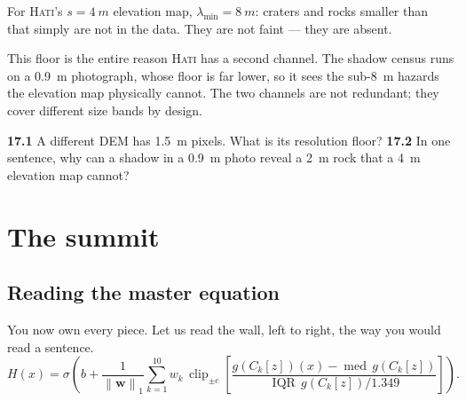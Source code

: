 \documentclass[11pt,oneside]{book}
\newcommand{\norm}[1]{\left\lVert #1\right\rVert}
\begin{document}
For \textsc{Hati}'s $s=\SI{4}{m}$ elevation map, $\lambda_{\min}=\SI{8}{m}$: craters and
rocks smaller than that simply are not in the data. They are not faint --- they are
absent.

\begin{hatibox}
This floor is the entire reason \textsc{Hati} has a second channel. The shadow census
runs on a \SI{0.9}{m} photograph, whose floor is far lower, so it sees the
sub-\SI{8}{m} hazards the elevation map physically cannot. The two channels are not
redundant; they cover different size bands by design.
\end{hatibox}

\begin{practice}
\textbf{17.1} A different DEM has \SI{1.5}{m} pixels. What is its resolution floor?
\quad\textbf{17.2} In one sentence, why can a shadow in a \SI{0.9}{m} photo reveal a
\SI{2}{m} rock that a \SI{4}{m} elevation map cannot?
\end{practice}

\part{The summit}

\chapter{Reading the master equation}

You now own every piece. Let us read the wall, left to right, the way you would read a
sentence.
\begin{equation*}
H(x)=\sigma\!\left(b+\frac{1}{\norm{\mathbf w}_1}\sum_{k=1}^{10} w_k\,
\operatorname{clip}_{\pm c}\!\left[\frac{g(C_k[z])(x)-\operatorname{med}\,g(C_k[z])}{\operatorname{IQR}\,g(C_k[z])/1.349}\right]\right).
\end{equation*}
\end{document}
